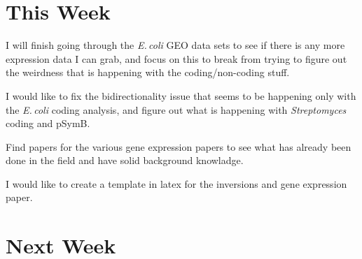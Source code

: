 \documentclass[12pt]{article}
\newcommand{\smel}{\textit{S.\,meliloti}\xspace}
\newcommand{\strep}{\textit{Streptomyces}\xspace}
\newcommand{\ecol}{\textit{E.\,coli}\xspace}
\newcommand{\pb}{pSymB\xspace}
\begin{document}


\section*{This Week}
I will finish going through the \ecol GEO data sets to see if there is any more expression data I can grab, and focus on this to break from trying to figure out the weirdness that is happening with the coding/non-coding stuff.

I would like to fix the bidirectionality issue that seems to be happening only with the \ecol coding analysis, and figure out what is happening with \strep coding and \pb.

Find papers for the various gene expression papers to see what has already been done in the field and have solid background knowladge.

I would like to create a template in latex for the inversions and gene expression paper.


\section*{Next Week}
\end{document}
